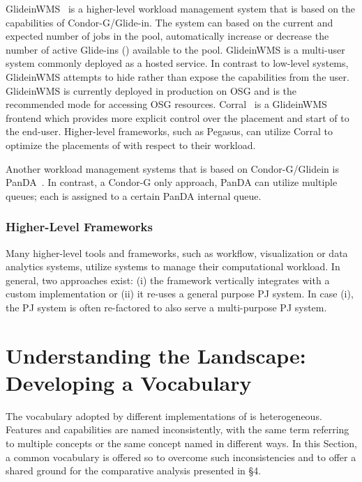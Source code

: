 \documentclass{sig-alternate}
\begin{document}
GlideinWMS~\cite{1742-6596-119-6-062044} is a higher-level workload management
system that is based on the \pilot capabilities of Condor-G/Glide-in. The
system can based on the current and expected number of jobs in the pool,
automatically increase or decrease the number of active Glide-ins (\pilots)
available to the pool. GlideinWMS is a multi-user \pilotjob system commonly
deployed as a hosted service. In contrast to low-level \pilotjob systems,
GlideinWMS attempts to hide rather than expose the \pilot capabilities from
the user. GlideinWMS is currently deployed in production on OSG and is the
recommended mode for accessing OSG resources.
Corral~\cite{Rynge:2011:EUG:2116259.2116599} is a GlideinWMS frontend which
provides more explicit control over the placement and start of \pilots to the
end-user. Higher-level frameworks, such as Pegasus, can utilize Corral to
optimize the placements of \pilots with respect to their workload.

Another workload management systems that is based on Condor-G/Glidein is
PanDA~\cite{1742-6596-331-7-072069}. In contrast, a Condor-G only approach,
PanDA can utilize multiple queues; each \pilot is assigned to a certain PanDA
internal queue.

\subsubsection{Higher-Level Frameworks}

Many higher-level tools and frameworks, such as workflow, visualization or
data analytics systems, utilize \pilotjob systems to manage their
computational workload. In general, two approaches exist: (i) the framework
vertically integrates with a custom \pilotjob implementation or (ii) it
re-uses a general purpose PJ system. In case (i), the PJ system is often
re-factored to also serve a multi-purpose PJ system.


\section{Understanding the Landscape: Developing a Vocabulary}
\label{sec:vocab}


The vocabulary adopted by different implementations of \pilotjob is
heterogeneous. Features and capabilities are named inconsistently, with
the same term referring to multiple concepts or the same concept named
in different ways. In this Section, a common vocabulary is offered so to
overcome such inconsistencies and to offer a shared ground for the
comparative analysis presented in \S 4.
\end{document}
